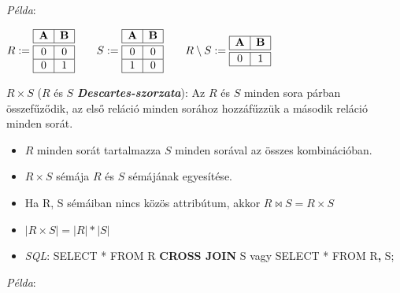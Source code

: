 \documentclass[tikz,12pt,margin=0px]{article}
\begin{document}
    \noindent \textit{Példa}:
    \begin{center}
        $R := \begin{array}{|c|c|}
         \hline
            \text{\textbf{A}} & \text{\textbf{B}} \\ \hline \hline
            0 & 0 \\ \hline
            0 & 1 \\ \hline
        \end{array} \qquad S := \begin{array}{|c|c|}
        \hline
            \text{\textbf{A}} & \text{\textbf{B}} \\ \hline \hline
            0 & 0 \\ \hline
            1 & 0 \\ \hline
        \end{array} \qquad
        R \setminus S := \begin{array}{|c|c|}
         \hline
            \text{\textbf{A}} & \text{\textbf{B}} \\ \hline \hline
            0 & 1 \\ \hline
        \end{array}$
    \end{center}

    \noindent $R \times S$ ($R$ és $S$ \emph{\textbf{Descartes-szorzata}}): Az $R$ és $S$ minden sora párban összefűződik, az első reláció minden sorához hozzáfűzzük a második reláció minden sorát.
    \begin{itemize}
        \item $R$ minden sorát tartalmazza $S$ minden sorával az összes kombinációban.
        \item $R \times S$ sémája $R$ és $S$ sémájának egyesítése.
        \item Ha R, S sémáiban nincs közös attribútum, akkor $R \bowtie S = R \times S$
        \item $\Big|R \times S\Big| = \Big|R\Big| * \Big|S\Big|$
        \item \emph{SQL}: SELECT * FROM R \textbf{CROSS JOIN} S vagy SELECT * FROM R\textbf{,} S;
    \end{itemize}

    \noindent \textit{Példa}:
\end{document}
